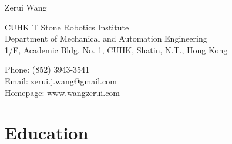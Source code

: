 \documentclass[10pt,letterpaper]{article}
\def\name{Zerui Wang}
\begin{document}
{\huge \name}


\bigskip

\begin{minipage}[t]{0.595\textwidth}
    CUHK T Stone Robotics Institute \\
    Department of Mechanical and Automation Engineering \\
    1/F, Academic Bldg. No. 1, CUHK, Shatin, N.T., Hong Kong
\end{minipage}
\begin{minipage}[t]{0.395\textwidth}
    Phone: (852) 3943-3541 \\
    Email: \href{mailto:zerui.j.wang@gmail.com}{zerui.j.wang@gmail.com} \\
    Homepage: \href{http://www.wangzerui.com/}{www.wangzerui.com}
\end{minipage}

\section*{Education}
\end{document}
